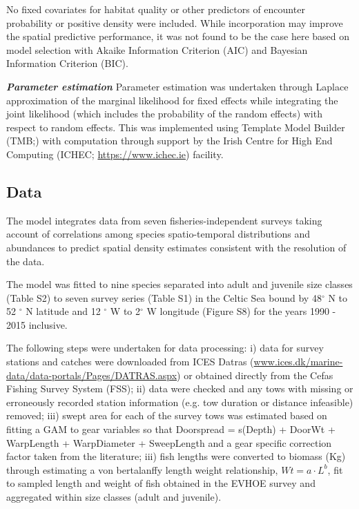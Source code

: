 \documentclass{nature}
\begin{document}
\begin{linenumbers}
No fixed covariates for habitat quality or other predictors of encounter
probability or positive density were included. While incorporation may improve
the spatial predictive performance\cite{Thorson2017}, it was not found to be
the case here based on model selection with Akaike Information Criterion (AIC)
and Bayesian Information Criterion (BIC).

\textbf{\textit{Parameter estimation}} Parameter estimation was undertaken
through Laplace approximation of the marginal likelihood for fixed effects
while integrating the joint likelihood (which includes the probability of the
random effects) with respect to random effects. This was implemented using
Template Model Builder (TMB;\cite{Kristensen2015}) with computation through
support by the Irish Centre for High End Computing (ICHEC;
\url{https://www.ichec.ie}) facility.  

\subsection{Data}

The model integrates data from seven fisheries-independent surveys taking
account of correlations among species spatio-temporal distributions and
abundances to predict spatial density estimates consistent with the resolution
of the data. 

The model was fitted to nine species separated into adult and juvenile size
classes (Table S2) to seven survey series (Table S1) in the Celtic Sea bound by
48$^{\circ}$ N to 52 $^{\circ}$ N latitude and 12 $^{\circ}$ W to 2$^{\circ}$ W
longitude (Figure S8) for the years 1990 - 2015 inclusive. 

The following steps were undertaken for data processing: i) data for survey
stations and catches were downloaded from ICES Datras
(\url{www.ices.dk/marine-data/data-portals/Pages/DATRAS.aspx}) or obtained
directly from the Cefas Fishing Survey System (FSS); ii) data were checked and
any tows with missing or erroneously recorded station information (e.g. tow
duration or distance infeasible) removed; iii) swept area for each of the
survey tows was estimated based on fitting a GAM to gear variables so that
Doorspread = s(Depth) + DoorWt + WarpLength + WarpDiameter + SweepLength and a
gear specific correction factor taken from the literature\cite{Piet2009}; iii)
fish lengths were converted to biomass (Kg) through estimating a von
bertalanffy length weight relationship, $Wt = a \cdot L^{b}$, fit to sampled
length and weight of fish obtained in the EVHOE survey and aggregated within
size classes (adult and juvenile). 


\end{linenumbers}
\end{document}

